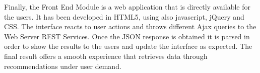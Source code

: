 Finally, the Front End Module is a web application that is directly available for the users. It has been developed in HTML5, using also javascript, jQuery and CSS. The interface reacts to user actions and throws different Ajax queries to the Web Server REST Services. Once the JSON response is obtained it is parsed in order to show the results to the users and update the interface as expected. The final result offers a smooth experience that retrieves data through recommendations under user demand. 

